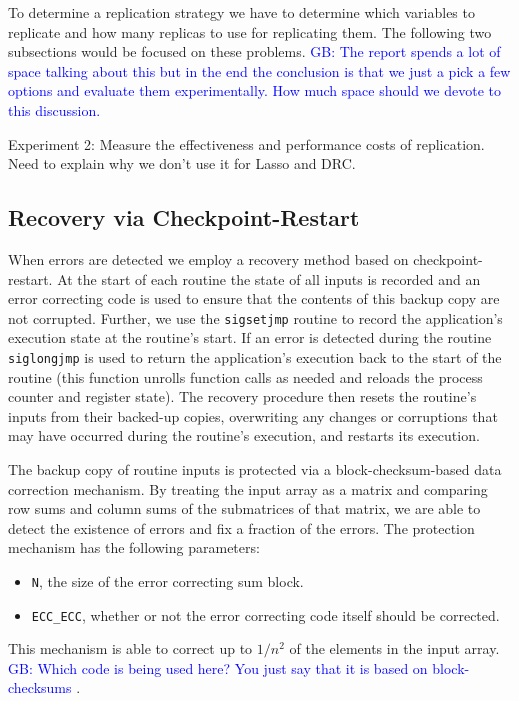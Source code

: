 \documentclass[prodmode,acmtecs]{acmconf} %
\newcommand{\greg}[1]{%
  \textcolor{blue}{GB: #1}
}
\begin{document}
To determine a replication strategy we have to determine which variables to replicate and how many replicas to use for replicating them. The following two subsections would be focused on these problems.
\greg{The report spends a lot of space talking about this but in the end the conclusion is that we just a pick a few options and evaluate them experimentally. How much space should we devote to this discussion.}

Experiment 2: Measure the effectiveness and performance costs of replication. Need to explain why we don't use it for Lasso and DRC.

\subsection{Recovery via Checkpoint-Restart}
\label{sec:res_tech:cr}

When errors are detected we employ a recovery method based on checkpoint-restart.
At the start of each routine the state of all inputs is recorded and an error correcting code is used to ensure that the contents of this backup copy are not corrupted.
Further, we use the \texttt{sigsetjmp} routine to record the application's execution state at the routine's start.
If an error is detected during the routine \texttt{siglongjmp} is used to return the application's execution back to the start of the routine (this function unrolls function calls as needed and reloads the process counter and register state).
The recovery procedure then resets the routine's inputs from their backed-up copies, overwriting any changes or corruptions that may have occurred during the routine's execution, and restarts its execution.

The backup copy of routine inputs is protected via a block-checksum-based data correction mechanism.
By treating the input array as a matrix and comparing row sums and column sums of the submatrices of that matrix, we are able to detect the existence of errors and fix a fraction of the errors.
The protection mechanism has the following parameters:
\begin{itemize}
\item{\texttt{N}, the size of the error correcting sum block.}
\item{\texttt{ECC\_ECC}, whether or not the error correcting code itself should be corrected.}
\end{itemize}
This mechanism is able to correct up to $1/{n^2}$ of the elements in the input array.
\greg{Which code is being used here? You just say that it is based on block-checksums}.
\end{document}
